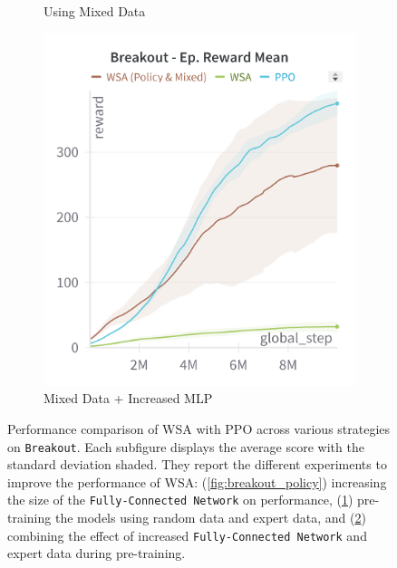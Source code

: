 \begin{figure}[ht]
\begin{subfigure}[b]{0.32\textwidth}
        \caption{Using Mixed Data}
        \label{fig:breakout_expert}
    \end{subfigure}
    \hfill
    \begin{subfigure}[b]{0.32\textwidth}
        \centering
        \includegraphics[width=\textwidth]{images/breakout_policy_mixed.png}
        \caption{Mixed Data + Increased MLP}
        \label{fig:breakout_expert_policy}
    \end{subfigure}
    \caption{Performance comparison of WSA with PPO across various strategies on \texttt{Breakout}. Each subfigure displays the average score with the standard deviation shaded. They report the different experiments to improve the performance of WSA: (\ref{fig:breakout_policy}) increasing the size of the \texttt{Fully-Connected Network} on performance, (\ref{fig:breakout_expert}) pre-training the models using random data and expert data, and (\ref{fig:breakout_expert_policy}) combining the effect of increased \texttt{Fully-Connected Network} and expert data during pre-training.}
    \label{fig:breakout_study}
\end{figure}


